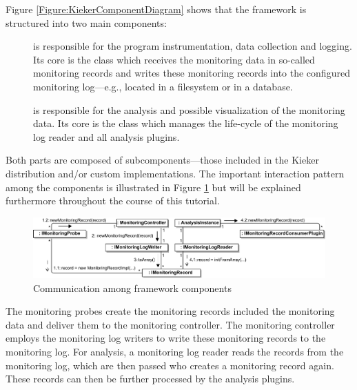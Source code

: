 \noindent Figure \ref{Figure:KiekerComponentDiagram} shows that the framework %
is structured into two main components:%
\begin{description}
\item[\KiekerMonitoringPart]
is responsible for the program instrumentation, data %
collection and logging. Its core is the class  %
which receives the monitoring data in so-called monitoring records and %
writes these monitoring records into the configured monitoring log---e.g., %
located in a filesystem or in a database.
\item[\KiekerAnalysisPart]
is responsible for the analysis and possible visualization of the %
monitoring data. Its core is the class  %
which manages the life-cycle of the monitoring log reader and all analysis plugins.
\end{description}


\noindent Both parts are composed of subcomponents---those included in the %
Kieker distribution and/or custom implementations. The important interaction pattern among %
the components is illustrated in Figure \ref{Figure:KiekerCommunicationDiagram} %
but will be explained furthermore throughout the course of this tutorial. %

\begin{figure}[H]\centering
\includegraphics[width=1\textwidth]{images/kiekerCommunications-revisedReArranged-woMonitoringLog-bw-newNames}
\caption{Communication among \Kieker{} framework components}
\label{Figure:KiekerCommunicationDiagram}
\end{figure}
		
\noindent The monitoring probes create the monitoring records included the %
monitoring data and deliver them to the monitoring controller. %
The monitoring controller employs the monitoring log writers to write these %
monitoring records to the monitoring log. %
For analysis, a monitoring log reader reads the records from the monitoring log, 
which are then passed  who creates a monitoring record again. These records can %
then be further processed by the analysis plugins.

